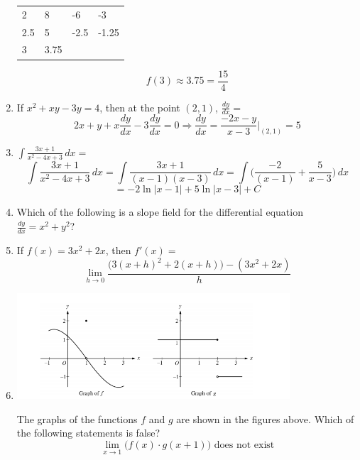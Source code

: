 \documentclass[12pt]{article}
\begin{document}
\begin{enumerate}
\begin{table}[h]
\begin{tabular}{l|l|l|l}
        2 & 8 & -6 & -3 \\
        2.5 & 5 & -2.5 & -1.25 \\
        3 & 3.75 &  & 
        \end{tabular}
        \end{table}
        $$f(3)\approx 3.75 = \boxed{\frac{15}{4}}$$
    \item If $x^2+xy-3y=4$, then at the point $(2, 1)$, $\frac{dy}{dx}=$
    $$2x+y+x\frac{dy}{dx}-3\frac{dy}{dx}=0 \Longrightarrow \frac{dy}{dx} = \frac{-2x-y}{x-3}\bigg\rvert_{(2,1)} = \boxed{5}$$
    \item $\int \frac{3x+1}{x^2-4x+3} \, dx=$
    $$\int \frac{3x+1}{x^2-4x+3} \, dx= \int \frac{3x+1}{(x-1)(x-3)} \, dx = \int \Biggr(\frac{-2}{(x-1)} + \frac{5}{x-3} \Biggr) \, dx$$ 
    $$= \boxed{ -2\ln|x-1|+5\ln|x-3|+C}$$
    \item Which of the following is a slope field for the differential equation $\frac{dy}{dx}=x^2+y^2$?
        \begin{center}
        \end{center}
    \item If $f(x) = 3x^2 + 2x$, then $f'(x) =$
    $$\boxed{\lim_{h\to 0} \frac{\big(3(x+h)^2+2(x+h)\big)-(3x^2+2x)}{h}}$$
    \item 
        \begin{center}
            \includegraphics[width=4in]{FEP2.png}
        \end{center}
    The graphs of the functions $f$ and $g$ are shown in the figures above. Which of the following statements is false?
    $$\boxed{\lim_{x \to 1} \big(f(x)\cdot g(x+1) \big) \text { does not exist}}$$

\end{enumerate}
\end{document}
